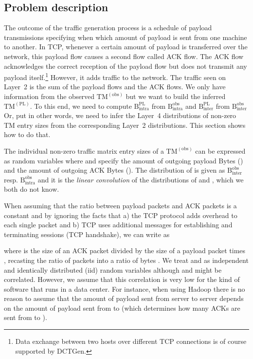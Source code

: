 \documentclass[journal,10pt]{IEEEtran}
\newcommand{\genname}{DCTGen}
\newcommand{\lt}{Layer~2}
\newcommand{\lf}{Layer~4}
\newcommand{\obstm}{\ensuremath{\mathrm{TM}^{(\mathrm{obs})}}}
\newcommand{\pltm}{\ensuremath{\mathrm{TM}^{(\mathrm{PL})}}}
\newcommand{\bytes}[2]{\ensuremath{\mathrm{B}^{\mathrm{#1}}_{\mathrm{#2}}}}
\begin{document}
\subsection{Problem description}
\label{sec:deconvolve_desc}
	The outcome of the traffic generation process is a schedule of payload transmissions specifying when which amount of payload is sent from one machine
	to another. 
	In TCP, whenever a certain amount of payload is transferred over the network, this payload flow causes a second flow called ACK flow.
	The ACK flow acknowledges the correct reception of the payload flow
	but does not transmit any payload itself.\footnote{Data exchange between two hosts over different TCP connections is of course supported by \genname{}.} 
	However, it adds traffic to the network. 
	The traffic seen on \lt{} is the sum of the payload flows and the ACK flows.
	We only have information from the observed \obstm{} but we want to build the inferred \pltm{}. 
	To this end, we need to compute \bytes{PL}{intra} from \bytes{obs}{intra} and \bytes{PL}{inter} from \bytes{obs}{inter}
	Or, put in other words, we need to infer the \lf{} distributions of non-zero TM entry sizes from the corresponding \lt{} distributions.
	This section shows how to do that.
		
	The individual non-zero traffic matrix entry sizes of a \obstm{} can be expressed as random variables  where  and 
	specify the amount of outgoing payload Bytes () and the amount of outgoing ACK Bytes ().
	The distribution of  is given as \bytes{obs}{inter} resp. \bytes{obs}{intra} and it is the \emph{linear convolution} of the distributions of  and ,
	which we both do not know.
	
	When assuming that the ratio between payload packets and ACK packets is a constant  and by ignoring the facts that a) the TCP protocol
	adds overhead to each single packet and b) TCP uses additional messages for establishing and terminating sessions (TCP handshake), we can write  as
	
	where  is the size of an ACK packet divided by the size of a payload packet times ,
	recasting the ratio of packets  into a ratio of bytes .
	We treat  and  as independent and identically distributed (iid) random variables
	although  and  might be correlated.
	However, we assume that this correlation is very low for the kind of software that runs in a data center.
	For instance, when using Hadoop there is no reason to assume that the amount of payload 
	sent from server  to server  depends on the amount of payload sent from  to  (which determines how many ACKs are sent from  to ).
	
\end{document}
